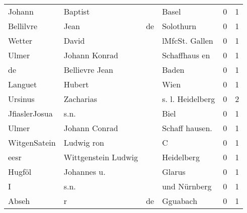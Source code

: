 \begin{center}
\begin{tiny}
\begin{longtabu}{llllrr}
                   Johann &                            Baptist &             &                                       Basel &          0 &         1 \\
                Bellilvre &                               Jean &          de &                                   Solothurn &          0 &         1 \\
                   Wetter &                              David &             &                              lMfcSt. Gallen &          0 &         1 \\
                    Ulmer &                      Johann Konrad &             &                               Schaffhaus en &          0 &         1 \\
                       de &                     Bellievre Jean &             &                                       Baden &          0 &         1 \\
                  Languet &                             Hubert &             &                                        Wien &          0 &         1 \\
                  Ursinus &                          Zacharias &             &                            s. l. Heidelberg &          0 &         2 \\
            JfiaslerJosua &                               s.n. &             &                                        Biel &          0 &         1 \\
                    Ulmer &                      Johann Conrad &             &                             Schaff hausen.  &          0 &         1 \\
             WitgenSatein &                         Ludwig ron &             &                                           C &          0 &         1 \\
                     eesr &                Wittgenstein Ludwig &             &                                  Heidelberg &          0 &         1 \\
                   Hugföl &                        Johannes u. &             &                                      Glarus &          0 &         1 \\
                        I &                               s.n. &             &                                und Nürnberg &          0 &         1 \\
                    Abseh &                                  r &          de &                                    Gguabach &          0 &         1 \\

\end{longtabu}
\end{tiny}
\end{center}
